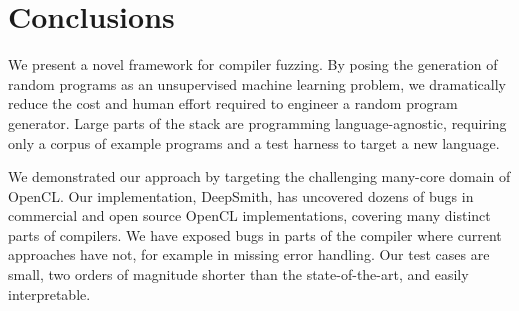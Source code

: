 \section{Conclusions}\label{sec:conclusion}

We present a novel framework for compiler fuzzing. By posing the generation of random programs as an unsupervised machine learning problem, we dramatically reduce the cost and human effort required to engineer a random program generator. Large parts of the stack are programming language-agnostic, requiring only a corpus of example programs and a test harness to target a new language.

We demonstrated our approach by targeting the challenging many-core domain of OpenCL. Our implementation, DeepSmith, has uncovered dozens of bugs in commercial and open source OpenCL implementations, covering many distinct parts of compilers. We have exposed bugs in parts of the compiler where current approaches have not, for example in missing error handling. Our test cases are small, two orders of magnitude shorter than the state-of-the-art, and easily interpretable. 


